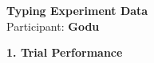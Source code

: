 \documentclass[10pt,a4paper]{article}
\begin{document}

\begin{center}
    {\Large\bfseries Typing Experiment Data}\\
    \vspace{2pt}
    Participant: \textbf{Godu}
\end{center}

\vspace{0.25cm}


\noindent
{\large\bfseries 1. Trial Performance}

\vspace{0.08cm}
\end{document}
